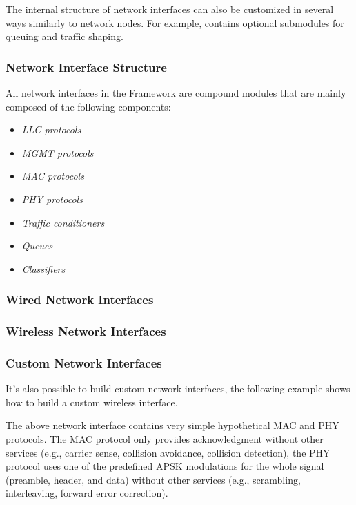 The internal structure of network interfaces can also be customized in several ways similarly to network nodes. For example,  contains optional submodules for queuing and traffic shaping.

\subsubsection*{Network Interface Structure}

All network interfaces in the \inet Framework are \omnet compound modules that are mainly composed of the following components:

\begin{itemize}
        \item \emph{LLC protocols}
        \item \emph{MGMT protocols}
        \item \emph{MAC protocols}
        \item \emph{PHY protocols}
        \item \emph{Traffic conditioners}
        \item \emph{Queues}
        \item \emph{Classifiers}
\end{itemize}

\subsubsection*{Wired Network Interfaces}


\subsubsection*{Wireless Network Interfaces}


\subsubsection*{Custom Network Interfaces}

It's also possible to build custom network interfaces, the following example shows how to build a custom wireless interface.


The above network interface contains very simple hypothetical MAC and PHY protocols. The MAC protocol only provides acknowledgment without other services (e.g., carrier sense, collision avoidance, collision detection), the PHY protocol uses one of the predefined APSK modulations for the whole signal (preamble, header, and data) without other services (e.g., scrambling, interleaving, forward error correction).

